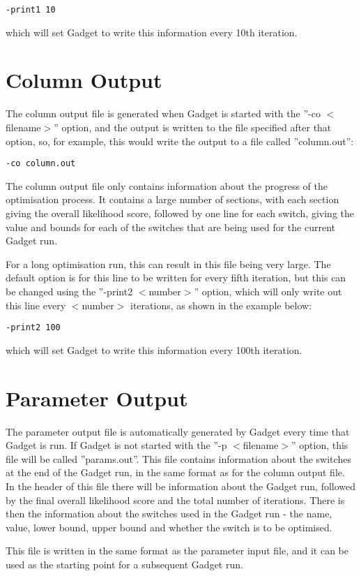 \documentclass [a4paper, 10pt]{book}
\begin{document}
{\small\begin{verbatim}
-print1 10
\end{verbatim}}

which will set Gadget to write this information every 10th iteration.

\section{Column Output}\label{sec:columnoutput}
The column output file is generated when Gadget is started with the ''-co $<$filename$>$'' option, and the output is written to the file specified after that option, so, for example, this would write the output to a file called ''column.out'':

{\small\begin{verbatim}
-co column.out
\end{verbatim}}

The column output file only contains information about the progress of the optimisation process.  It contains a large number of sections, with each section giving the overall likelihood score, followed by one line for each switch, giving the value and bounds for each of the switches that are being used for the current Gadget run.

\bigskip
For a long optimisation run, this can result in this file being very large.  The default option is for this line to be written for every fifth iteration, but this can be changed using the ''-print2 $<$number$>$'' option, which will only write out this line every $<$number$>$ iterations, as shown in the example below:

{\small\begin{verbatim}
-print2 100
\end{verbatim}}

which will set Gadget to write this information every 100th iteration.

\section{Parameter Output}\label{sec:paramoutput}
The parameter output file is automatically generated by Gadget every time that Gadget is run.  If Gadget is not started with the ''-p $<$filename$>$'' option, this file will be called ''params.out''.  This file contains information about the switches at the end of the Gadget run, in the same format as for the column output file.  In the header of this file there will be information about the Gadget run, followed by the final overall likelihood score and the total number of iterations.  There is then the information about the switches used in the Gadget run - the name, value, lower bound, upper bound and whether the switch is to be optimised.

\bigskip
This file is written in the same format as the parameter input file, and it can be used as the starting point for a subsequent Gadget run.
\end{document}
